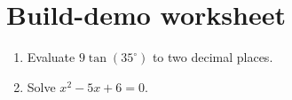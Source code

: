 \documentclass[12pt]{article}
\begin{document}
\section*{Build-demo worksheet}
\begin{enumerate}[label=\textbf{\arabic*.}, itemsep=5cm]
  \item Evaluate $9\tan(35^\circ)$ to two decimal places. \ansline
  \item Solve $x^2 - 5x + 6 = 0$. \ansline
\end{enumerate}
\end{document}
